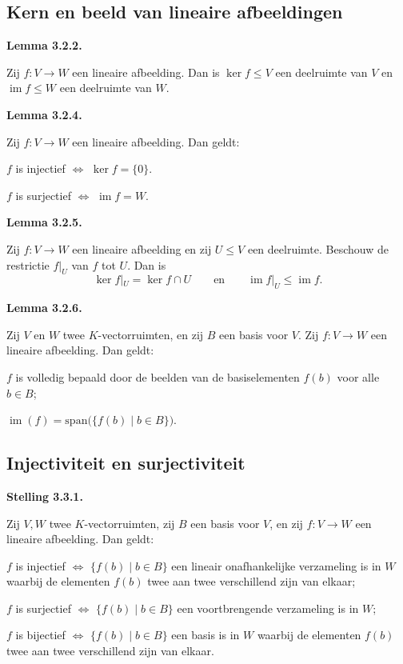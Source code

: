 \documentclass[10pt,a4paper]{article}
\newenvironment{res}[2]{%
  \par\noindent\textbf{#1 #2.}%
}{%
  \par\vspace{2pt}\normalfont
}
\begin{document}
\subsection{Kern en beeld van lineaire afbeeldingen}
\begin{res}{Lemma}{3.2.2}
Zij $f:V\to W$ een lineaire afbeelding. Dan is $\ker f\le V$ een deelruimte van $V$ en $\operatorname{im} f\le W$ een deelruimte van $W$.
\end{res}

\begin{res}{Lemma}{3.2.4}
Zij $f:V\to W$ een lineaire afbeelding. Dan geldt:
\begin{myenum}
\item $f$ is injectief \(\iff\) $\ker f=\{0\}$.
\item $f$ is surjectief \(\iff\) $\operatorname{im} f=W$.
\end{myenum}
\end{res}

\begin{res}{Lemma}{3.2.5}
Zij $f:V\to W$ een lineaire afbeelding en zij $U\le V$ een deelruimte. Beschouw de restrictie $f|_U$ van $f$ tot $U$. Dan is
\[
\ker f|_U=\ker f\cap U \qquad\text{en}\qquad \operatorname{im} f|_U\le \operatorname{im} f.
\]
\end{res}

\begin{res}{Lemma}{3.2.6}
Zij $V$ en $W$ twee $K$-vectorruimten, en zij $B$ een basis voor $V$. Zij $f:V\to W$ een lineaire afbeelding. Dan geldt:
\begin{myenum}
\item $f$ is volledig bepaald door de beelden van de basiselementen $f(b)$ voor alle $b\in B$;
\item $\operatorname{im}(f)=\mathrm{span}\big(\{f(b)\mid b\in B\}\big)$.
\end{myenum}
\end{res}

\subsection{Injectiviteit en surjectiviteit}
\begin{res}{Stelling}{3.3.1}
Zij $V,W$ twee $K$-vectorruimten, zij $B$ een basis voor $V$, en zij $f:V\to W$ een lineaire afbeelding. Dan geldt:
\begin{myenum}
\item $f$ is injectief \(\iff\) $\{f(b)\mid b\in B\}$ een lineair onafhankelijke verzameling is in $W$ waarbij de elementen $f(b)$ twee aan twee verschillend zijn van elkaar;
\item $f$ is surjectief \(\iff\) $\{f(b)\mid b\in B\}$ een voortbrengende verzameling is in $W$;
\item $f$ is bijectief \(\iff\) $\{f(b)\mid b\in B\}$ een basis is in $W$ waarbij de elementen $f(b)$ twee aan twee verschillend zijn van elkaar.
\end{myenum}
\end{res}
\end{document}
